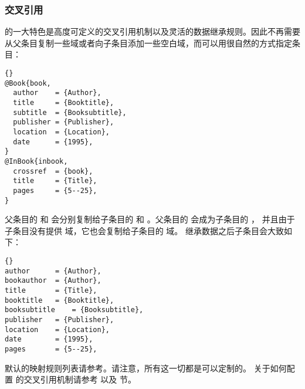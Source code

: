 \subsubsection{交叉引用}%
\label{bib:cav:ref}


\biber 的一大特色是高度可定义的交叉引用机制以及灵活的数据继承规则。因此不再需要从父条目复制一些域或者向子条目添加一些空白域，而可以用很自然的方式指定条目：

\begin{lstlisting}[style=bibtex]{}
@Book{book,
  author	= {Author},
  title		= {Booktitle},
  subtitle	= {Booksubtitle},
  publisher	= {Publisher},
  location	= {Location},
  date		= {1995},
}
@InBook{inbook,
  crossref	= {book},
  title		= {Title},
  pages		= {5--25},
}
\end{lstlisting}
%
父条目的  和  会分别复制给子条目的  和 。父条目的  会成为子条目的 ，
并且由于子条目没有提供  域，它也会复制给子条目的  域。
继承数据之后子条目会大致如下：

\begin{lstlisting}[style=bibtex]{}
author	  	= {Author},
bookauthor	= {Author},
title		= {Title},
booktitle	= {Booktitle},
booksubtitle	= {Booksubtitle},
publisher	= {Publisher},
location	= {Location},
date		= {1995},
pages		= {5--25},
\end{lstlisting}
%
默认的映射规则列表请参考。请注意，所有这一切都是可以定制的。
关于如何配置 \biber 的交叉引用机制请参考  以及  节。

